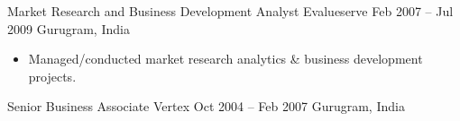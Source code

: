 \documentclass[a4paper,]{fortysecondscv}
\begin{document}
\begin{cvtable}
{\begin{itemize}[nosep, leftmargin=12pt , label={-}]
        \end{itemize}
    }
    \vspace{\topsep}
    \cvitemoneblock
    {Market Research and Business Development Analyst}
    {Evalueserve}
    {Feb 2007 -- Jul 2009}
    {Gurugram, India}
    {
        \begin{itemize}[nosep, leftmargin=12pt , label={-}] %
            \item Managed\//conducted market research analytics \& business development projects.
        \end{itemize}
    }
    \vspace{\topsep}
    \cvitemoneblock
    {Senior Business Associate}
    {Vertex}
    {Oct 2004 -- Feb 2007}
    {Gurugram, India}
    {
    }
\end{cvtable}





\newpage
\makebacksidebar


\end{document}
